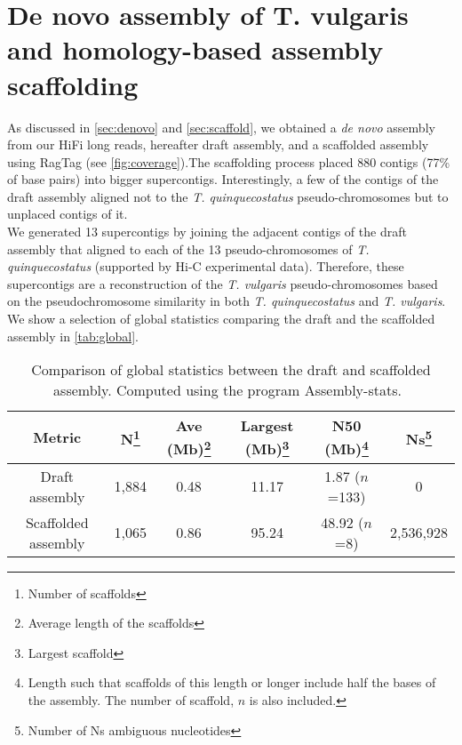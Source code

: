 \section{De novo assembly of T. vulgaris and homology-based assembly scaffolding}

As discussed in \autoref{sec:denovo} and \autoref{sec:scaffold}, we obtained a \textit{de novo} assembly from our HiFi long reads, hereafter draft assembly, and a scaffolded assembly using RagTag (see \autoref{fig:coverage}).The scaffolding process placed 880 contigs (77\% of base pairs) into bigger supercontigs.  Interestingly, a few of the contigs of the draft assembly aligned not to the \textit{T. quinquecostatus} pseudo-chromosomes but to unplaced contigs of it. \\

We generated 13 supercontigs by joining the adjacent contigs of the draft assembly that aligned to each of the 13 pseudo-chromosomes of \textit{T. quinquecostatus} (supported by Hi-C experimental data). Therefore,  these supercontigs are a reconstruction of the \textit{T. vulgaris} pseudo-chromosomes based on the pseudochromosome similarity in both \textit{T. quinquecostatus} and \textit{T. vulgaris}. We show a selection of global statistics comparing the draft and the scaffolded assembly in \autoref{tab:global}. \\

\begin{table}[h!]
    \begin{minipage}{\linewidth}
    \renewcommand\thefootnote{\thempfootnote}
    \centering
    \begin{tabular}{@{}cccccc@{}}
        \toprule
        Metric              & N\footnote{Number of scaffolds}    & Ave (Mb)\footnote{Average length of the scaffolds} & Largest (Mb)\footnote{Largest scaffold} & N50 (Mb)\footnote{Length such that scaffolds of this length or longer include half the bases of the assembly. The number of scaffold, $n$ is also included.}     & Ns\footnote{Number of Ns ambiguous nucleotides}      \\ \midrule
        Draft assembly      & 1,884 & 0.48     & 11.17        & 1.87 ($n$=133) & 0       \\
        Scaffolded assembly & 1,065 & 0.86     & 95.24        & 48.92 ($n$=8)  & 2,536,928 \\ \bottomrule
        \end{tabular}
        \caption{Comparison of global statistics between the draft and scaffolded assembly. Computed using the program Assembly-stats.~\cite{Assemblystats2023}}
        \label{tab:global}
\end{minipage}
\end{table}

